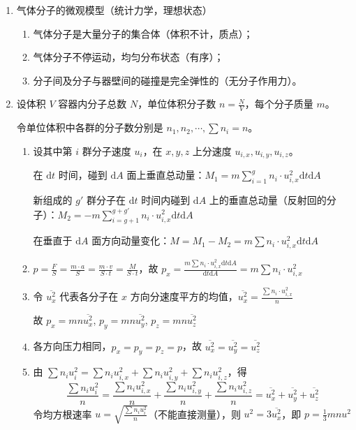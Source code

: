 \begin{enumerate}
    \item 气体分子的微观模型（统计力学，理想状态）
    \begin{enumerate}
        \item 气体分子是大量分子的集合体（体积不计，质点）；
        \item 气体分子不停运动，均匀分布状态（有序）；
        \item 分子间及分子与器壁间的碰撞是完全弹性的（无分子作用力）。
    \end{enumerate}
    \item 设体积 $V$ 容器内分子总数 $N$，单位体积分子数 $n = \frac{N}{V}$，每个分子质量 $m$。
    
    令单位体积中各群的分子数分别是 $n_1, n_2, \cdots, \sum n_i = n$。
    \begin{enumerate}
        \item 设其中第 $i$ 群分子速度 $u_i$，在 $x, y, z$ 上分速度 $u_{i,x}, u_{i,y}, u_{i,z}$。
        
        在 $\mathrm{d}t$ 时间，碰到 $\mathrm{d}A$ 面上垂直总动量：$M_1 = m \sum_{i=1}^{g} n_i \cdot u_{i,x}^2 \mathrm{d}t \mathrm{d}A$
        
        新组成的 $g'$ 群分子在 $\mathrm{d}t$ 时间内碰到 $\mathrm{d}A$ 上的垂直总动量（反射回的分子）：$M_2 = -m \sum_{i=g+1}^{g+g'} n_i \cdot u_{i,x}^2 \mathrm{d}t \mathrm{d}A$
        
        在垂直于 $\mathrm{d}A$ 面方向动量变化：$M = M_1 - M_2 = m \sum n_i \cdot u_{i,x}^2 \mathrm{d}t \mathrm{d}A$
        
        \item $p = \frac{F}{S} = \frac{m \cdot a}{S} = \frac{m \cdot v}{S \cdot t} = \frac{M}{S \cdot t}$，故 $p_x = \frac{m \sum n_i \cdot u_{i,x}^2 \mathrm{d}t \mathrm{d}A}{\mathrm{d}t \mathrm{d}A} = m \sum n_i \cdot u_{i,x}^2$
        
        \item 令 $\overline{u_x^2}$ 代表各分子在 $x$ 方向分速度平方的均值，$\overline{u_x^2} = \frac{\sum n_i \cdot u_{i,x}^2}{n}$
        
        故 $p_x = m n \overline{u_x^2}$, $p_y = m n \overline{u_y^2}$, $p_z = m n \overline{u_z^2}$
        
        \item 各方向压力相同，$p_x = p_y = p_z = p$，故 $\overline{u_x^2} = \overline{u_y^2} = \overline{u_z^2}$
        
        \item 由 $\sum n_i u_i^2 = \sum n_i u_{i,x}^2 + \sum n_i u_{i,y}^2 + \sum n_i u_{i,z}^2$，得 
        \begin{equation*}
            \frac{\sum n_i u_i^2}{n} = \frac{\sum n_i u_{i,x}^2}{n} + \frac{\sum n_i u_{i,y}^2}{n} + \frac{\sum n_i u_{i,z}^2}{n} = \overline{u_x^2} + \overline{u_y^2} + \overline{u_z^2}
        \end{equation*}
        令均方根速率 $u = \sqrt{\frac{\sum n_i u_i^2}{n}}$（不能直接测量），则 $u^2 = 3\overline{u_x^2}$，即 $p = \frac13 m n u^2$
        

\end{enumerate}
\end{enumerate}
